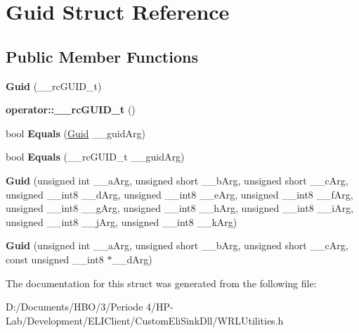 \hypertarget{struct_guid}{}\section{Guid Struct Reference}
\label{struct_guid}
\subsection*{Public Member Functions}
\begin{DoxyCompactItemize}
\item 
\mbox{\label{struct_guid_a22207cea3aa773a789006fec0e12caaf}} 
{\bfseries Guid} (\+\_\+\+\_\+rc\+G\+U\+I\+D\+\_\+t)
\item 
\mbox{\label{struct_guid_a865e18408c7fac735de06eb5adfd1cc7}} 
{\bfseries operator\+::\+\_\+\+\_\+rc\+G\+U\+I\+D\+\_\+t} ()
\item 
\mbox{\label{struct_guid_a238b122e53bf296e058e854407bff3bf}} 
bool {\bfseries Equals} (\hyperlink{struct_guid}{Guid} \+\_\+\+\_\+guid\+Arg)
\item 
\mbox{\label{struct_guid_aaacfc1495f028c8a01fd8642153a12a7}} 
bool {\bfseries Equals} (\+\_\+\+\_\+rc\+G\+U\+I\+D\+\_\+t \+\_\+\+\_\+guid\+Arg)
\item 
\mbox{\label{struct_guid_a829a07d1d75067fd917c470d83e98a70}} 
{\bfseries Guid} (unsigned int \+\_\+\+\_\+a\+Arg, unsigned short \+\_\+\+\_\+b\+Arg, unsigned short \+\_\+\+\_\+c\+Arg, unsigned \+\_\+\+\_\+int8 \+\_\+\+\_\+d\+Arg, unsigned \+\_\+\+\_\+int8 \+\_\+\+\_\+e\+Arg, unsigned \+\_\+\+\_\+int8 \+\_\+\+\_\+f\+Arg, unsigned \+\_\+\+\_\+int8 \+\_\+\+\_\+g\+Arg, unsigned \+\_\+\+\_\+int8 \+\_\+\+\_\+h\+Arg, unsigned \+\_\+\+\_\+int8 \+\_\+\+\_\+i\+Arg, unsigned \+\_\+\+\_\+int8 \+\_\+\+\_\+j\+Arg, unsigned \+\_\+\+\_\+int8 \+\_\+\+\_\+k\+Arg)
\item 
\mbox{\label{struct_guid_af94ece3321a706ec19360659a9b1fbfa}} 
{\bfseries Guid} (unsigned int \+\_\+\+\_\+a\+Arg, unsigned short \+\_\+\+\_\+b\+Arg, unsigned short \+\_\+\+\_\+c\+Arg, const unsigned \+\_\+\+\_\+int8 $\ast$\+\_\+\+\_\+d\+Arg)
\end{DoxyCompactItemize}


The documentation for this struct was generated from the following file\+:\begin{DoxyCompactItemize}
\item 
D\+:/\+Documents/\+H\+B\+O/3/\+Periode 4/\+H\+P-\/\+Lab/\+Development/\+E\+L\+I\+Client/\+Custom\+Eli\+Sink\+Dll/W\+R\+L\+Utilities.\+h\end{DoxyCompactItemize}
